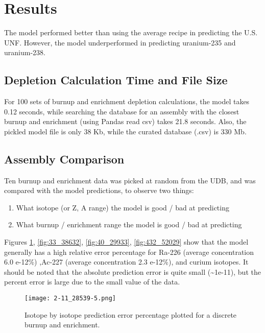 \section{Results}

The model performed better than using the average
recipe in predicting the U.S. \gls{UNF}. However,
the model underperformed in predicting uranium-235
and uranium-238.


\subsection{Depletion Calculation Time and File Size}

For 100 sets of
burnup and enrichment depletion calculations,
the model takes 0.12 seconds, while
searching the database for an assembly
with the closest burnup and enrichment (using Pandas read csv)
takes 21.8 seconds. Also, the pickled model file is only
38 Kb, while the curated database (.csv) is 330 Mb.

\subsection{Assembly Comparison}

Ten burnup and enrichment data was picked at random from the \gls{UDB},
and was compared with the model predictions, to observe
two things:
\begin{enumerate}
    \item What isotope (or Z, A range) the model is good / bad 
        at predicting
    \item What burnup / enrichment range the model is good / bad
        at predicting
\end{enumerate}

Figures \ref{fig:211_28539}, \ref{fig:33_38632},
\ref{fig:40_29933}, \ref{fig:432_52029} show that the model
generally has a high relative error percentage for Ra-226
(average concentration 6.0 e-12\%) ,Ac-227 (average concentration  2.3 e-12\%), and curium isotopes. It should
be noted that the absolute prediction error is quite small
(\textasciitilde 1e-11), but the percent error is large due
to the small value of the data.

\begin{figure}
    \centering
    \texttt{[image: 2-11\_28539-5.png]}
    \caption{Isotope by isotope prediction error percentage
             plotted for a discrete burnup and enrichment.
             }
    \label{fig:211_28539}
\end{figure}



